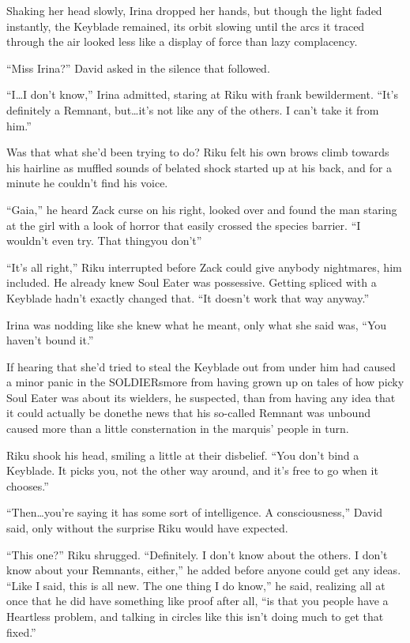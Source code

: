 Shaking her head slowly, Irina dropped her hands, but though the light faded instantly, the Keyblade remained, its orbit slowing until the arcs it traced through the air looked less like a display of force than lazy complacency.

``Miss Irina?'' David asked in the silence that followed.

``I\ldots I don't know,'' Irina admitted, staring at Riku with frank bewilderment. ``It's definitely a Remnant, but\ldots it's not like any of the others. I can't take it from him.''

Was that what she'd been trying to do? Riku felt his own brows climb towards his hairline as muffled sounds of belated shock started up at his back, and for a minute he couldn't find his voice.

``Gaia,'' he heard Zack curse on his right, looked over and found the man staring at the girl with a look of horror that easily crossed the species barrier. ``I wouldn't even try. That thing\textemdash you don't\textemdash''

``It's all right,'' Riku interrupted before Zack could give anybody nightmares, him included. He already knew Soul Eater was possessive. Getting spliced with a Keyblade hadn't exactly changed that. ``It doesn't work that way anyway.''

Irina was nodding like she knew what he meant, only what she said was, ``You haven't bound it.''

If hearing that she'd tried to steal the Keyblade out from under him had caused a minor panic in the SOLDIERs\textemdash more from having grown up on tales of how picky Soul Eater was about its wielders, he suspected, than from having any idea that it could actually be done\textemdash the news that his so-called Remnant was unbound caused more than a little consternation in the marquis' people in turn.

Riku shook his head, smiling a little at their disbelief. ``You don't bind a Keyblade. It picks you, not the other way around, and it's free to go when it chooses.''

``Then\ldots you're saying it has some sort of intelligence. A consciousness,'' David said, only without the surprise Riku would have expected.

``This one?'' Riku shrugged. ``Definitely. I don't know about the others. I don't know about your Remnants, either,'' he added before anyone could get any ideas. ``Like I said, this is all new. The one thing I do know,'' he said, realizing all at once that he did have something like proof after all, ``is that you people have a Heartless problem, and talking in circles like this isn't doing much to get that fixed.''

